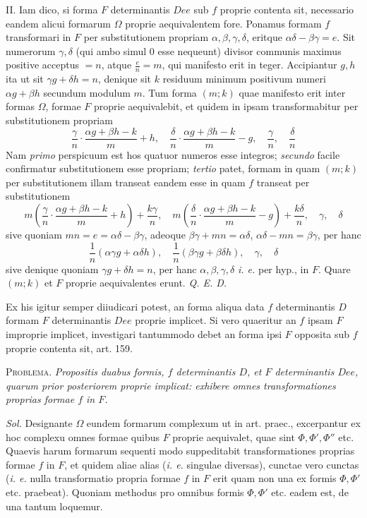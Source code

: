 II. Iam dico, si forma $F$ determinantis $Dee$ sub $f$ proprie contenta sit, necessario eandem alicui formarum $\Omega$ proprie aequivalentem fore. Ponamus formam $f$ transformari in $F$ per substitutionem propriam $\alpha,\beta,\gamma,\delta$, eritque $\alpha\delta-\beta\gamma=e$. Sit numerorum $\gamma,\delta$ (qui ambo simul 0 esse nequeunt) divisor communis maximus positive acceptus $=n$, atque $\frac{e}{n}=m$, qui manifesto erit in%
%
teger. Accipiantur $g,h$ ita ut sit $\gamma g+\delta h=n$, denique sit $k$ residuum minimum positivum numeri $\alpha g+\beta h$ secundum modulum $m$. Tum forma $(m;k)$ quae manifesto erit inter formas $\Omega$, formae $F$ proprie aequivalebit, et quidem in ipsam transformabitur per substitutionem propriam
\[
\frac{\gamma}{n}\cdot\frac{\alpha g+\beta h-k}{m}+h,\quad
\frac{\delta}{n}\cdot\frac{\alpha g+\beta h-k}{m}-g,\quad
\frac{\gamma}{n},\quad\frac{\delta}{n}
\]
Nam \textit{primo} perspicuum est hos quatuor numeros esse integros; \textit{secundo} facile confirmatur substitutionem esse propriam; \textit{tertio} patet, formam in quam $(m;k)$ per substitutionem illam transeat eandem esse in quam $f$ transeat per substitutionem
\[
m\left(\frac{\gamma}{n}\cdot\frac{\alpha g+\beta h-k}{m}+h\right)+\frac{k\gamma}{n},\quad
m\left(\frac{\delta}{n}\cdot\frac{\alpha g+\beta h-k}{m}-g\right)+\frac{k\delta}{n},\quad\gamma,\quad\delta
\]
sive quoniam $mn=e=\alpha\delta-\beta\gamma$, adeoque $\beta\gamma+mn=\alpha\delta$, $\alpha\delta-mn=\beta\gamma$, per hanc
\[
\frac{1}{n}(\alpha\gamma g+\alpha\delta h),\quad
\frac{1}{n}(\beta\gamma g+\beta\delta h),\quad\gamma,\quad\delta
\]
sive denique quoniam $\gamma g+\delta h=n$, per hanc $\alpha,\beta,\gamma,\delta$ \textit{i. e.} per hyp., in $F$. Quare $(m;k)$ et $F$ proprie aequivalentes erunt. \textit{Q. E. D.}

Ex his igitur semper diiudicari potest, an forma aliqua data $f$ determinantis $D$ formam $F$ determinantis $Dee$ proprie implicet. Si vero quaeritur an $f$ ipsam $F$ improprie implicet, investigari tantummodo debet an forma ipsi $F$ opposita sub $f$ proprie contenta sit, art. 159.

\textsc{Problema.} \textit{Propositis duabus formis, $f$ determinantis $D$, et $F$ determinantis $Dee$, quarum prior posteriorem proprie implicat: exhibere omnes transformationes proprias formae $f$ in $F$.}

\textit{Sol.} Designante $\Omega$ eundem formarum complexum ut in art. praec., excerpantur ex hoc complexu omnes formae quibus $F$ proprie aequivalet, quae sint $\Phi,\Phi',\Phi''$ etc. Quaevis harum formarum sequenti modo suppeditabit transformationes proprias formae $f$ in $F$, et quidem aliae alias (\textit{i. e.} singulae diversas), cunctae vero cunctas (\textit{i. e.} nulla transformatio propria formae $f$ in $F$ erit quam non una ex formis $\Phi,\Phi'$ etc. praebeat). Quoniam methodus pro omnibus formis $\Phi,\Phi'$ etc. eadem est, de una tantum loquemur.

